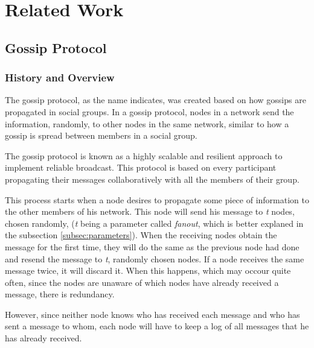 
%

\chapter{Related Work}
\label{cha:related_work}

\section{Gossip Protocol}
\label{sec:gossip_protocol}

\subsection{History and Overview}
\label{subsec:history_overview}
The gossip protocol, as the name indicates, was created based on how gossips are
propagated in social groups. In a gossip protocol, nodes in a network send the
information, randomly, to other nodes in the same network, similar to how a gossip is
spread between members in a social group\cite{Leitao2007}.

The gossip protocol is known as a highly scalable and resilient approach to implement
reliable broadcast. This protocol is based on every participant propagating their messages
collaboratively with all the members of their group.

This process starts when a node desires to propagate some piece of information to the
other members of his network. This node will send his message to \textit{t} nodes,
chosen randomly, (\textit{t} being a parameter called \textit{fanout}, which is better
explaned in the subsection \ref{subsec:parameters}). When the receiving nodes obtain the
message for the first time, they will do the same as the previous node had done and
resend the message to \textit{t}, randomly chosen nodes. If a node receives the same
message twice, it will discard it. When this happens, which may occour quite often,
since the nodes are unaware of which nodes have already received a message, there is
redundancy.

However, since neither node knows who has received each message and who has sent a
message to whom, each node will have to keep a log of all messages that he has already
received.

